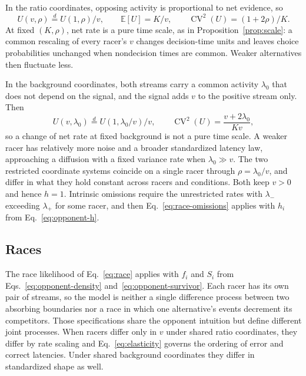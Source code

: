 \documentclass[12pt]{article}
\newcommand{\E}{\mathbb{E}}
\theoremstyle{definition}
\theoremstyle{plain}
\theoremstyle{remark}
\begin{document}
In the ratio coordinates, opposing activity is proportional to net evidence, so
\begin{equation}
 U(v,\rho)\overset{d}{=}U(1,\rho)/v,\qquad
 \E[U]=K/v,\qquad \operatorname{CV}^2(U)=(1+2\rho)/K.\label{eq:opponent-ratio}
\end{equation}
At fixed $(K,\rho)$, net rate is a pure time scale, as in Proposition~\ref{prop:scale}: a common rescaling of every racer's $v$ changes decision-time units and leaves choice probabilities unchanged when nondecision times are common. Weaker alternatives then fluctuate less.

In the background coordinates, both streams carry a common activity $\lambda_0$ that does not depend on the signal, and the signal adds $v$ to the positive stream only. Then
\begin{equation}
 U(v,\lambda_0)\overset{d}{=}U(1,\lambda_0/v)/v,\qquad
 \operatorname{CV}^2(U)=\frac{v+2\lambda_0}{Kv},\label{eq:opponent-background}
\end{equation}
so a change of net rate at fixed background is not a pure time scale. A weaker racer has relatively more noise and a broader standardized latency law, approaching a diffusion with a fixed variance rate when $\lambda_0\gg v$. The two restricted coordinate systems coincide on a single racer through $\rho=\lambda_0/v$, and differ in what they hold constant across racers and conditions. Both keep $v>0$ and hence $h=1$. Intrinsic omissions require the unrestricted rates with $\lambda_-$ exceeding $\lambda_+$ for some racer, and then Eq.~\eqref{eq:race-omissions} applies with $h_i$ from Eq.~\eqref{eq:opponent-h}.

\subsection{Races}
The race likelihood of Eq.~\eqref{eq:race} applies with $f_i$ and $S_i$ from Eqs.~\eqref{eq:opponent-density} and~\eqref{eq:opponent-survivor}. Each racer has its own pair of streams, so the model is neither a single difference process between two absorbing boundaries nor a race in which one alternative's events decrement its competitors. Those specifications share the opponent intuition but define different joint processes. When racers differ only in $v$ under shared ratio coordinates, they differ by rate scaling and Eq.~\eqref{eq:elasticity} governs the ordering of error and correct latencies. Under shared background coordinates they differ in standardized shape as well.
\end{document}
